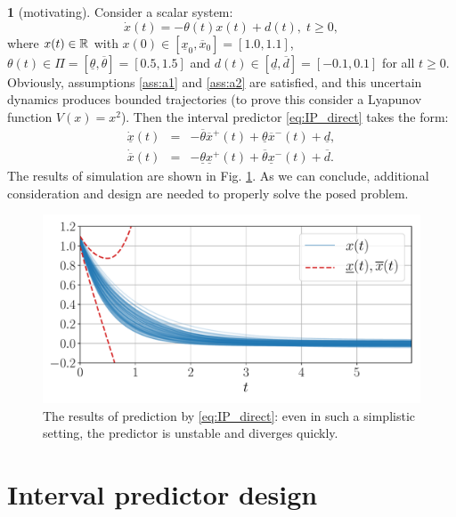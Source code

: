 \documentclass[twocolumn,english]{IEEEtran}
\theoremstyle{plain}
\theoremstyle{definition}
\newtheorem*{example*}{\protect\examplename}
\theoremstyle{plain}
\theoremstyle{plain}
\theoremstyle{remark}
\providecommand{\examplename}{Example}
\begin{document}
\begin{example*}
[motivating] Consider a scalar system:
\[
\dot{x}(t)=-\theta(t)x(t)+d(t),\;t\geq0,
\]
where $x(t)\in\mathbb{R}$ with $x(0)\in[\underline{x}_{0},\overline{x}_{0}]=[1.0, 1.1]$, $\theta(t)\in\Pi=[\underline{\theta},\overline{\theta}]=[0.5,1.5]$ and $d(t)\in[\underline{d},\overline{d}]=[-0.1,0.1]$ for all $t\geq0$. Obviously, assumptions \ref{ass:a1} and \ref{ass:a2} are satisfied, and this uncertain dynamics produces bounded trajectories (to prove this consider a Lyapunov function $V(x)=x^{2}$). Then the interval predictor \eqref{eq:IP_direct} takes the form:
\begin{eqnarray*}
\dot{\underline{x}}(t) & = & -\overline{\theta}\overline{x}^{+}(t)+\underline{\theta}\overline{x}^{-}(t)+\underline{d},\\
\dot{\overline{x}}(t) & = & -\underline{\theta}\underline{x}^{+}(t)+\overline{\theta}\underline{x}^{-}(t)+\overline{d}.
\end{eqnarray*}
The results of simulation are shown in Fig. \ref{fig:IP_Direct}. As we can conclude, additional consideration and design are needed to properly solve the posed problem.
\begin{figure}
\begin{centering}
\includegraphics[width=\linewidth]{observer}
\par\end{centering}
\caption{\label{fig:IP_Direct} The results of prediction by \eqref{eq:IP_direct}: even in such a simplistic setting, the predictor is unstable and diverges quickly.}
\end{figure}
\end{example*}

\section{\label{sec:Main-results} Interval predictor design}
\end{document}
